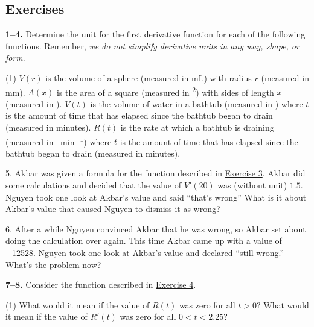 \documentclass[10pt,oneside,]{book}
\newcommand{\lt}{<}
\newcommand{\gt}{>}
\theoremstyle{plain}
\theoremstyle{definition}
\numberwithin{equation}{section}
\newcommand{\fe}[2]{#1\mathopen{}\left(#2\right)\mathclose{}}
\newcommand{\fd}[1]{#1'}
\begin{document}
\subsection[Exercises]{Exercises}\label{exercises-22}
\textbf{1--4. }\hypertarget{exercisegroup-38}{\null}Determine the unit for the first derivative function for each of the following functions. Remember, \emph{we do not simplify derivative units in any way, shape, or form}.%
\par
\begin{exercisegroup}(1)
\exercise[1.]\hypertarget{exercise-193}{\null}\(\fe{V}{r}\) is the volume of a sphere (measured in \si{\milli\liter}) with radius \(r\) (measured in \si{\milli\meter}).%
\exercise[2.]\hypertarget{exercise-194}{\null}\(\fe{A}{x}\) is the area of a square (measured in \si{\foot\tothe{2}}) with sides of length \(x\) (measured in \si{\foot}).%
\exercise[3.]\hypertarget{exercise-bathtub}{\null}\(\fe{V}{t}\) is the volume of water in a bathtub (measured in \si{\gallon}) where \(t\) is the amount of time that has elapsed since the bathtub began to drain (measured in minutes).%
\exercise[4.]\hypertarget{exercise-bathtub-rate}{\null}\(\fe{R}{t}\) is the rate at which a bathtub is draining (measured in \si{\gallon\per\minute}) where \(t\) is the amount of time that has elapsed since the bathtub began to drain (measured in minutes).%
\end{exercisegroup}
\par\smallskip\noindent
\begin{exerciselist}
\item[5.]\hypertarget{exercise-197}{\null}Akbar was given a formula for the function described in \hyperlink{exercise-bathtub}{Exercise 3}. Akbar did some calculations and decided that the value of \(\fe{\fd{V}}{20}\) was (without unit) \(1.5\). Nguyen took one look at Akbar's value and said ``that's wrong'' What is it about Akbar's value that caused Nguyen to dismiss it as wrong?%
\par\smallskip
\item[6.]\hypertarget{exercise-198}{\null}After a while Nguyen convinced Akbar that he was wrong, so Akbar set about doing the calculation over again. This time Akbar came up with a value of \num{-12528}. Nguyen took one look at Akbar's value and declared ``still wrong.'' What's the problem now?%
\par\smallskip
\end{exerciselist}
\textbf{7--8. }\hypertarget{exercisegroup-39}{\null}Consider the function described in \hyperlink{exercise-bathtub-rate}{Exercise 4}.%
\par
\begin{exercisegroup}(1)
\exercise[7.]\hypertarget{exercise-199}{\null}What would it mean if the value of \(\fe{R}{t}\) was zero for all \(t\gt0\)?%
\exercise[8.]\hypertarget{exercise-200}{\null}What would it mean if the value of \(\fe{\fd{R}}{t}\) was zero for all \(0\lt t\lt2.25\)?%
\end{exercisegroup}
\par\smallskip\noindent
\typeout{************************************************}
\typeout{************************************************}
\end{document}
